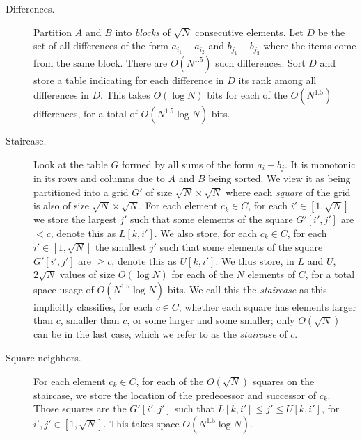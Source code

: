 \begin{description}
\item[Differences.]
  Partition $A$ and $B$ into \emph{blocks} of $\sqrt{N}$ consecutive elements.
  Let $D$ be the set of all differences of the form $a_{i_1}-a_{i_2}$ and
  $b_{j_1}-b_{j_2}$
  where the items come from the same block. There are $O(N^{1.5})$ such
  differences. Sort $D$ and store a table indicating for each difference in $D$
  its rank among all differences in $D$. This takes $O(\log N)$ bits for each
  of the $O(N^{1.5})$ differences, for a total of $O(N^{1.5}\log N)$ bits.

\item[Staircase.]
  Look at the table $G$ formed by all sums of the form $a_i+b_j$. It is
  monotonic in its rows and columns due to $A$ and $B$ being sorted. We view it
  as being partitioned into a grid $G'$ of size $\sqrt{N}\times \sqrt{N}$ where
  each \emph{square} of the grid is also of size $\sqrt{N}\times \sqrt{N}$.
  For each element $c_k \in C$, for each $i'\in[1,\sqrt{N}]$ we store the largest
  $j'$ such that some elements of the square $G'[i',j']$ are  $< c$, denote this as
  $L[k,i']$.
  We also store, for each $c_k \in C$, for each $i'\in[1,\sqrt{N}]$ the smallest
  $j'$ such that some elements of the square $G'[i',j']$ are  $\geq c$, denote this as
  $U[k,i']$.
  We thus store, in $L$ and $U$, $2 \sqrt{N}$ values of size $O(\log N)$ for each
  of the $N$ elements of $C$, for a total space usage of $O(N^{1.5}\log N)$ bits.
  We call this the \emph{staircase} as this implicitly classifies, for each $c
  \in C$, whether each square has elements larger than $c$, smaller than $c$, or
  some larger and some smaller; only $O(\sqrt{N})$ can be in the last case, which
  we refer to as the \emph{staircase} of $c$.

\item[Square neighbors.]
  For each element $c_k \in C$, for each of the $O(\sqrt{N})$ squares on the
  staircase, we store the location of the predecessor and successor of $c_k$.
  Those squares are the \(G'[i',j']\) such that
  $L[k,i'] \le j' \le U[k,i']$, for $i',j' \in [1,\sqrt{N}]$.
  This takes space $O(N^{1.5}\log N)$.
\end{description}

